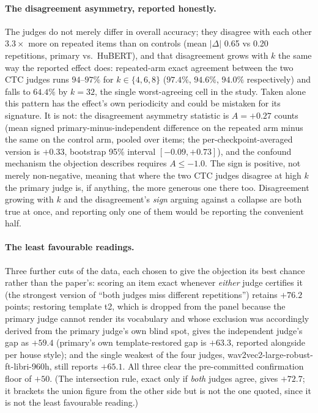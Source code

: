\documentclass[11pt]{article}
\begin{document}
\paragraph{The disagreement asymmetry, reported honestly.} The judges do not
merely differ in overall accuracy; they disagree with each other $3.3\times$
more on repeated items than on controls (mean $|\Delta|$ 0.65 vs 0.20
repetitions, primary vs.\ HuBERT), and that disagreement grows with $k$ the
same way the reported effect does: repeated-arm exact agreement between the
two CTC judges runs $94$--$97\%$ for $k\in\{4,6,8\}$ ($97.4\%$, $94.6\%$,
$94.0\%$ respectively) and falls to $64.4\%$ by $k{=}32$, the single
worst-agreeing cell in the study. Taken alone this pattern has the effect's
own periodicity and could be mistaken for its signature. It is not: the
disagreement asymmetry statistic is $A = +0.27$ counts (mean signed
primary-minus-independent difference on the repeated arm minus the same on
the control arm, pooled over items; the per-checkpoint-averaged version is
$+0.33$, bootstrap 95\% interval $[-0.09, +0.73]$), and the confound
mechanism the objection describes requires $A\le-1.0$. The sign is positive,
not merely non-negative, meaning that where the two CTC judges disagree at
high $k$ the primary judge is, if anything, the more generous one there too.
Disagreement growing with $k$ and the disagreement's \emph{sign} arguing
against a collapse are both true at once, and reporting only one of them
would be reporting the convenient half.

\paragraph{The least favourable readings.} Three further cuts of the data,
each chosen to give the objection its best chance rather than the paper's:
scoring an item exact whenever \emph{either} judge certifies it (the
strongest version of ``both judges miss different repetitions'') retains
$+76.2$ points; restoring template t2, which is dropped from the panel
because the primary judge cannot render its vocabulary and whose exclusion
was accordingly derived from the primary judge's own blind spot, gives the
independent judge's gap as $+59.4$ (primary's own template-restored gap is
$+63.3$, reported alongside per house style); and the single weakest of the
four judges, wav2vec2-large-robust-ft-libri-960h, still reports $+65.1$. All
three clear the pre-committed confirmation floor of $+50$. (The intersection
rule, exact only if \emph{both} judges agree, gives $+72.7$; it
brackets the union figure from the other side but is not the one quoted,
since it is not the least favourable reading.)
\end{document}
